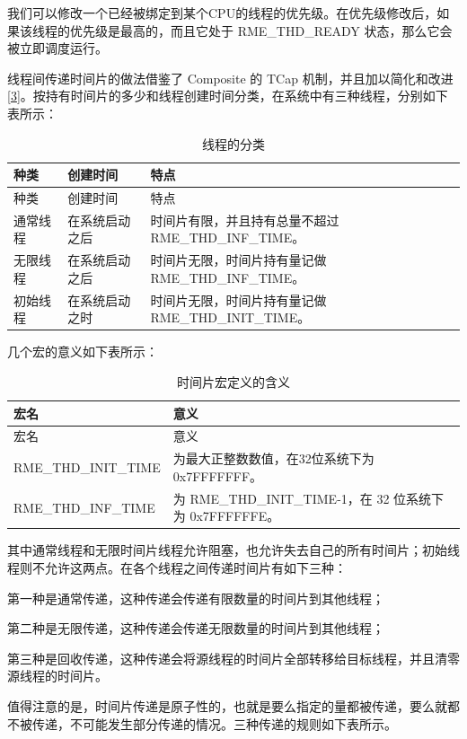 我们可以修改一个已经被绑定到某个CPU的线程的优先级。在优先级修改后，如果该线程的优先级是最高的，而且它处于 RME\_THD\_READY 状态，那么它会被立即调度运行。

线程间传递时间片的做法借鉴了 Composite 的 TCap 机制，并且加以简化和改进\hyperref[cite:4-3]{{[}3{]}}。按持有时间片的多少和线程创建时间分类，在系统中有三种线程，分别如下表所示：

\begin{xltabular}{\textwidth}{@{}>{\hsize\raggedright\arraybackslash}X>{\hsize\raggedright\arraybackslash}X>{\hsize\raggedright\arraybackslash}X@{}}
\caption{线程的分类}\label{tab:4-2-thread-categories}\\
\toprule
种类 & 创建时间 & 特点\tabularnewline
\endfirsthead
\toprule
种类 & 创建时间 & 特点\tabularnewline
\midrule
\endhead
\bottomrule
\endlastfoot
通常线程 & 在系统启动之后 &
时间片有限，并且持有总量不超过 RME\_THD\_INF\_TIME。\tabularnewline
无限线程 & 在系统启动之后 &
时间片无限，时间片持有量记做 RME\_THD\_INF\_TIME。\tabularnewline
初始线程 & 在系统启动之时 &
时间片无限，时间片持有量记做 RME\_THD\_INIT\_TIME。\tabularnewline
\end{xltabular}

几个宏的意义如下表所示：

\begin{xltabular}{\textwidth}{@{}>{\hsize\raggedright\arraybackslash}X>{\hsize\raggedright\arraybackslash}X@{}}
\caption{时间片宏定义的含义}\label{tab:4-3-time-slice-macro-definitions}\\
\toprule
宏名 & 意义\tabularnewline
\endfirsthead
\toprule
宏名 & 意义\tabularnewline
\midrule
\endhead
\bottomrule
\endlastfoot
RME\_THD\_INIT\_TIME &
为最大正整数数值，在32位系统下为0x7FFFFFFF。\tabularnewline
RME\_THD\_INF\_TIME & 为 RME\_THD\_INIT\_TIME-1，在 32 位系统下为 0x7FFFFFFE。\tabularnewline
\end{xltabular}

其中通常线程和无限时间片线程允许阻塞，也允许失去自己的所有时间片；初始线程则不允许这两点。在各个线程之间传递时间片有如下三种：

第一种是通常传递，这种传递会传递有限数量的时间片到其他线程；

第二种是无限传递，这种传递会传递无限数量的时间片到其他线程；

第三种是回收传递，这种传递会将源线程的时间片全部转移给目标线程，并且清零源线程的时间片。

值得注意的是，时间片传递是原子性的，也就是要么指定的量都被传递，要么就都不被传递，不可能发生部分传递的情况。三种传递的规则如下表所示。

